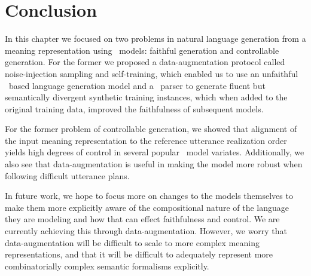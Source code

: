 \section{Conclusion}

In this chapter we focused on two problems in natural language generation from
a meaning representation using \sequencetosequence~models: faithful generation
and controllable generation.  For the former we proposed a data-augmentation
protocol called noise-injection sampling and self-training, which enabled us to
use an unfaithful \sequencetosequence~based language generation model and a
\meaningrepresentation~parser to generate fluent but semantically divergent
synthetic training instances, which when added to the original training data,
improved the faithfulness of subsequent models.

For the former problem of controllable generation, we showed that alignment of
the input meaning representation to the reference utterance realization order
yields high degrees of control in several popular \sequencetosequence~model
variates. Additionally, we also see that data-augmentation is useful in making
the model more robust when following difficult utterance plans.

In future work, we hope to focus more on changes to the models themselves to
make them more explicitly aware of the compositional nature of the language
they are modeling and how that can effect faithfulness and control.  We are
currently achieving this through data-augmentation. However, we worry that
data-augmentation will be difficult to scale to more complex meaning
representations, and that it will be difficult to adequately represent more
combinatorially complex semantic formalisms explicitly.
